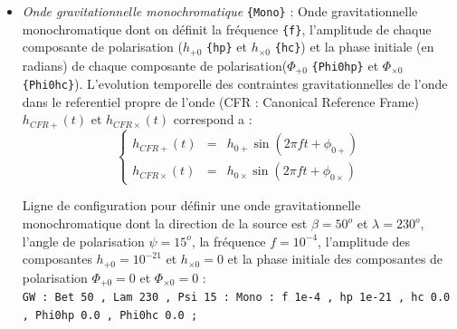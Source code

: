 \documentclass[a4paper,english,12pt]{article}
\begin{document}
\begin{itemize}
\item { \it Onde gravitationnelle monochromatique } \texttt{\{Mono\}} : Onde gravitationnelle monochromatique dont on d\'efinit la fr\'equence \texttt{\{f\}}, l'amplitude de chaque composante de polarisation ($h_{+0}$ \texttt{\{hp\}} et $h_{\times 0} $ \texttt{\{hc\}}) et la phase initiale (en radians) de chaque composante de polarisation($\Phi_{+0}$ \texttt{\{Phi0hp\}} et $\Phi_{\times 0} $ \texttt{\{Phi0hc\}}). L'evolution temporelle des contraintes gravitationnelles de l'onde dans le referentiel propre de l'onde (CFR : Canonical Reference Frame) ${h}_{CFR+} (t)$ et ${h}_{CFR\times} (t)$ correspond a :
\begin{equation} 
\left\{ \begin{array}{lll}  
{h}_{CFR+} (t) & = & h_{0+}  \sin \left( 2 \pi f t + \phi_{0+}\right)\\ 
h_{CFR\times} (t) & = & h_{0\times}  \sin \left( 2 \pi f t + \phi_{0\times}\right) 
\end{array} \right.  
\label{GWMono} 
\end{equation}

Ligne de configuration pour d\'efinir une onde gravitationnelle monochromatique dont la direction de la source est $\beta = 50^{o}$ et $\lambda = 230^{o}$, l'angle de polarisation $\psi = 15^{o}$, la fr\'equence $f=10^{-4}$, l'amplitude des composantes $h_{+0}=10^{-21}$ et $h_{\times0}=0$ et la phase initiale des composantes de polarisation $\Phi_{+0} = 0$ et $\Phi_{\times 0} = 0$ :\\
\hphantom{aaaaa}\texttt{GW : Bet 50 , Lam 230 , Psi 15 : Mono : f 1e-4 , hp 1e-21 , hc 0.0 , Phi0hp 0.0 , Phi0hc 0.0 ;}  \\


\end{itemize}
\end{document}
